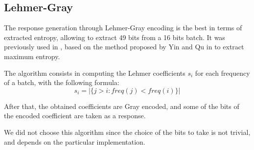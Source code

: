 \subsection{Lehmer-Gray}
\label{subsec:lehmer}

The response generation through Lehmer-Gray encoding is the best in terms of extracted entropy,
allowing to extract 49 bits from a 16 bits batch. It was previously used in \cite{PUFKY}, based on the method proposed
by Yin and Qu in \cite{YinQu} to extract maximum entropy.

The algorithm consists in computing the Lehmer coefficients $s_i$ for each frequency of a batch, with the following formula:
\begin{equation}
    \label{eq:lehmer_coeff}
    s_i = |\{j > i : freq(j)<freq(i)\}|
\end{equation}

After that, the obtained coefficients are Gray encoded, and some of the bits of the encoded coefficient are taken as a response.

We did not choose this algorithm since the choice of the bits to take is not trivial, and depends on the particular implementation.
